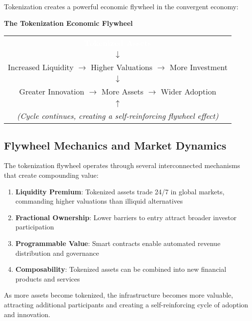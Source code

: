 \documentclass[11pt,a4paper]{report}
\begin{document}
Tokenization creates a powerful economic flywheel in the convergent economy:

\vspace{0.5cm}

\begin{center}
\textbf{The Tokenization Economic Flywheel}

\vspace{0.3cm}

\begin{tabular}{c}
\colorbox{ocean}{\textcolor{white}{\textbf{Tokenized Assets}}} \\
$\downarrow$ \\
Increased Liquidity $\rightarrow$ Higher Valuations $\rightarrow$ More Investment \\
$\downarrow$ \\
Greater Innovation $\rightarrow$ More Assets $\rightarrow$ Wider Adoption \\
$\uparrow$ \\
\textit{(Cycle continues, creating a self-reinforcing flywheel effect)}
\end{tabular}
\end{center}

\vspace{0.5cm}

\subsection{Flywheel Mechanics and Market Dynamics}

The tokenization flywheel operates through several interconnected mechanisms that create compounding value:

\begin{enumerate}
    \item \textbf{Liquidity Premium}: Tokenized assets trade 24/7 in global markets, commanding higher valuations than illiquid alternatives
    \item \textbf{Fractional Ownership}: Lower barriers to entry attract broader investor participation
    \item \textbf{Programmable Value}: Smart contracts enable automated revenue distribution and governance
    \item \textbf{Composability}: Tokenized assets can be combined into new financial products and services
\end{enumerate}

\begin{keypoint}
As more assets become tokenized, the infrastructure becomes more valuable, attracting additional participants and creating a self-reinforcing cycle of adoption and innovation.
\end{keypoint}
\end{document}
